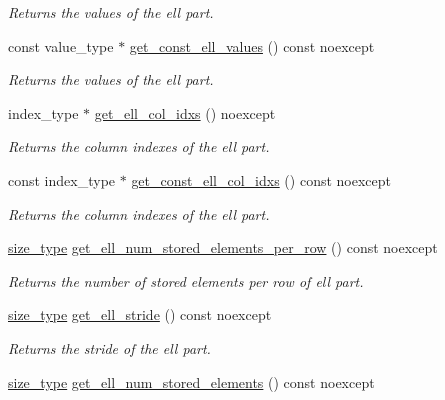 \begin{DoxyCompactItemize}
\begin{DoxyCompactList}\small\item\em Returns the values of the ell part. \end{DoxyCompactList}\item 
const value\+\_\+type $\ast$ \hyperlink{classgko_1_1matrix_1_1Hybrid_af792e702c3650f4e77e8cb256250f21e}{get\+\_\+const\+\_\+ell\+\_\+values} () const noexcept
\begin{DoxyCompactList}\small\item\em Returns the values of the ell part. \end{DoxyCompactList}\item 
index\+\_\+type $\ast$ \hyperlink{classgko_1_1matrix_1_1Hybrid_ac46548ef106a6b8fe32219d3e11aab22}{get\+\_\+ell\+\_\+col\+\_\+idxs} () noexcept
\begin{DoxyCompactList}\small\item\em Returns the column indexes of the ell part. \end{DoxyCompactList}\item 
const index\+\_\+type $\ast$ \hyperlink{classgko_1_1matrix_1_1Hybrid_a7cba3bbddd3f2f921b65bcb8cd208df5}{get\+\_\+const\+\_\+ell\+\_\+col\+\_\+idxs} () const noexcept
\begin{DoxyCompactList}\small\item\em Returns the column indexes of the ell part. \end{DoxyCompactList}\item 
\hyperlink{namespacegko_a6e5c95df0ae4e47aab2f604a22d98ee7}{size\+\_\+type} \hyperlink{classgko_1_1matrix_1_1Hybrid_a9ac6d0efc8627c915c73a0155e64548d}{get\+\_\+ell\+\_\+num\+\_\+stored\+\_\+elements\+\_\+per\+\_\+row} () const noexcept
\begin{DoxyCompactList}\small\item\em Returns the number of stored elements per row of ell part. \end{DoxyCompactList}\item 
\hyperlink{namespacegko_a6e5c95df0ae4e47aab2f604a22d98ee7}{size\+\_\+type} \hyperlink{classgko_1_1matrix_1_1Hybrid_a2472495b537b47555a04aa6ba11d5817}{get\+\_\+ell\+\_\+stride} () const noexcept
\begin{DoxyCompactList}\small\item\em Returns the stride of the ell part. \end{DoxyCompactList}\item 
\hyperlink{namespacegko_a6e5c95df0ae4e47aab2f604a22d98ee7}{size\+\_\+type} \hyperlink{classgko_1_1matrix_1_1Hybrid_a99ab36f3aeae944db440a8bbe324aaff}{get\+\_\+ell\+\_\+num\+\_\+stored\+\_\+elements} () const noexcept

\end{DoxyCompactItemize}
